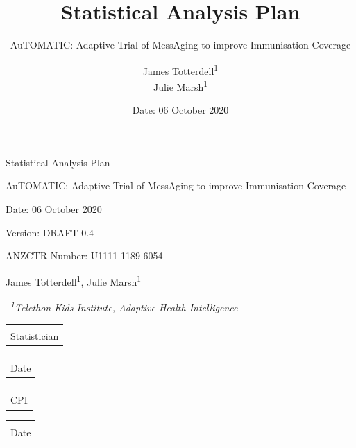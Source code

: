 \documentclass[
  bibliography=totoc]{scrreprt}
\title{Statistical Analysis Plan}
\subtitle{AuTOMATIC: Adaptive Trial of MessAging to improve Immunisation Coverage}
\author{James Totterdell\textsuperscript{1} \\ Julie Marsh\textsuperscript{1}}
\affil{\textsuperscript{1}Telethon Kids Institute, Adaptive Health Intelligence}
\date{Date: 06 October 2020}
\makeatletter
\newcommand{\titledate}[2][2.5in]{%
  \noindent%
  \begin{tabular}{@{}p{#1}@{}}
    \\ \hline \\[-.75\normalbaselineskip]
    #2
  \end{tabular} \hspace{1in}
  \begin{tabular}{@{}p{#1}@{}}
    \\ \hline \\[-.75\normalbaselineskip]
    Date
  \end{tabular}\vspace{4\baselineskip}
}
\makeatother
\begin{document}

\begin{titlepage}


  \begin{center}
    {\sectfont\Huge Statistical Analysis Plan\par}\vspace{3\baselineskip}
    {\huge AuTOMATIC: Adaptive Trial of MessAging to improve Immunisation Coverage\par}\vspace{3\baselineskip}
  \end{center}
  {\large Date: 06 October 2020\par}\vspace{0.5\baselineskip}
  {\large Version: DRAFT 0.4\par}\vspace{0.5\baselineskip}
  {\large ANZCTR Number: U1111-1189-6054\par}\vspace{0.5\baselineskip}
  {\large           James Totterdell\textsuperscript{1},
          Julie Marsh\textsuperscript{1}  \par}\vspace{0.5\baselineskip}
  {\large\          \textit{\textsuperscript{1}Telethon Kids Institute, Adaptive Health Intelligence}  \par}\vspace{10\baselineskip}

  \titledate{Statistician}
  \titledate{CPI}\vfill

\end{titlepage}

\end{document}
